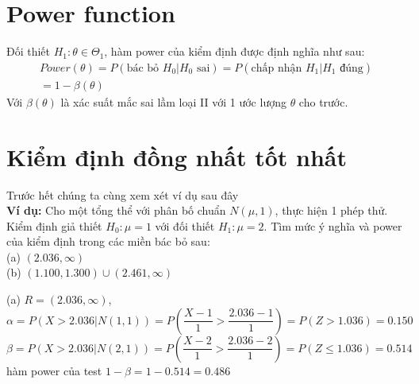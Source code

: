 \section{Power function}
Đối thiết $H_1: \theta \in \Theta_1$, hàm power của kiểm định được định nghĩa như sau:
\begin{equation}
	\begin{split}
		Power(\theta) = P(\text{bác bỏ } H_0 | H_0 \text{ sai}) = P(\text{chấp nhận } H_1 | H_1 \text{ đúng}) \\
		= 1 - \beta(\theta)
	\end{split}
\end{equation}
Với $\beta(\theta)$ là xác suất mắc sai lầm loại II với 1 ước lượng $\theta$ cho trước.

\section{Kiểm định đồng nhất tốt nhất}
Trước hết chúng ta cùng xem xét ví dụ sau đây \\
\textbf{Ví dụ: } Cho một tổng thể với phân bố chuẩn $N(\mu, 1)$, thực hiện 1 phép thử. 
Kiểm định giả thiết $H_0: \mu = 1$ với đối thiết $H_1: \mu = 2$. Tìm mức ý nghĩa và power của kiểm định 
trong các miền bác bỏ sau: \\
(a) $(2.036, \infty)$ \\
(b) $(1.100, 1.300) \cup (2.461, \infty)$

(a) $R = (2.036, \infty)$,
$$\alpha = P(X > 2.036 | N(1, 1)) = P(\frac{X-1}{1} > \frac{2.036-1}{1}) = P(Z > 1.036) = 0.150$$
$$\beta = P(X > 2.036 | N(2, 1)) = P(\frac{X-2}{1} > \frac{2.036-2}{1}) = P(Z \leqslant 1.036) = 0.514$$
hàm power của test $1 - \beta = 1 - 0.514 = 0.486$

